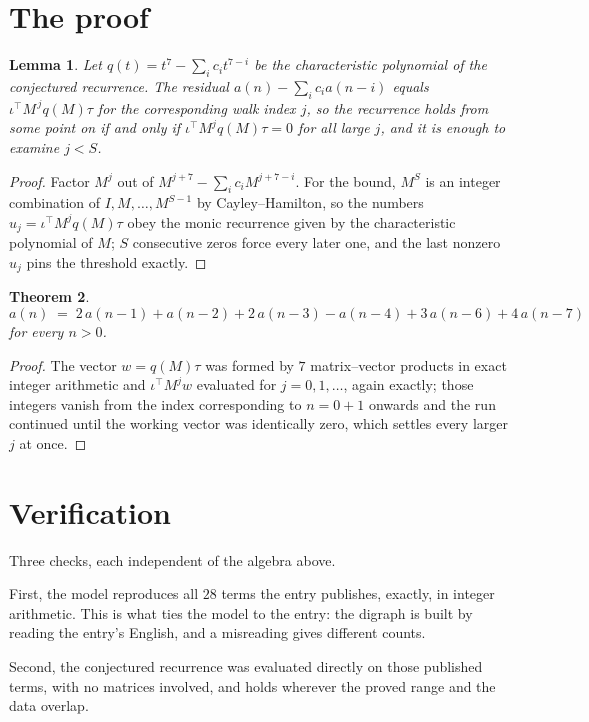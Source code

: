\documentclass[11pt,a4paper]{article}
\theoremstyle{plain}
\newtheorem{theorem}{Theorem}
\newtheorem{lemma}[theorem]{Lemma}
\theoremstyle{definition}
\begin{document}
\section{The proof}

\begin{lemma}\label{lem:crit}
Let $q(t)=t^{7}-\sum_i c_it^{7-i}$ be the characteristic polynomial of the
conjectured recurrence. The residual $a(n)-\sum_ic_ia(n-i)$ equals
$\iota^{\!\top}M^{\,j}q(M)\tau$ for the corresponding walk index $j$, so the recurrence
holds from some point on if and only if $\iota^{\!\top}M^{j}q(M)\tau=0$ for all large $j$,
and it is enough to examine $j<S$.
\end{lemma}

\begin{proof}
Factor $M^{j}$ out of $M^{j+7}-\sum_ic_iM^{j+7-i}$. For the bound, $M^{S}$
is an integer combination of $I,M,\dots,M^{S-1}$ by Cayley--Hamilton, so the numbers
$u_j=\iota^{\!\top}M^{j}q(M)\tau$ obey the monic recurrence given by the characteristic
polynomial of $M$; $S$ consecutive zeros force every later one, and the last nonzero $u_j$
pins the threshold exactly.
\end{proof}

\begin{theorem}
\[
a(n)\;=\;2\,a(n-1) + a(n-2) + 2\,a(n-3) - a(n-4) + 3\,a(n-6) + 4\,a(n-7)
\]
for every $n>0$.
\end{theorem}

\begin{proof}
The vector $w=q(M)\tau$ was formed by $7$ matrix--vector products in exact integer
arithmetic and $\iota^{\!\top}M^{j}w$ evaluated for $j=0,1,\dots$, again exactly; those
integers vanish from the index corresponding to $n=0+1$ onwards and the run continued
until the working vector was identically zero, which settles every larger $j$ at once.
\end{proof}

\section{Verification}

Three checks, each independent of the algebra above.

First, the model reproduces all $28$ terms the entry publishes, exactly, in integer
arithmetic. This is what ties the model to the entry: the digraph is built by reading the
entry's English, and a misreading gives different counts.

Second, the conjectured recurrence was evaluated directly on those published terms, with no
matrices involved, and holds wherever the proved range and the data overlap.
\end{document}
